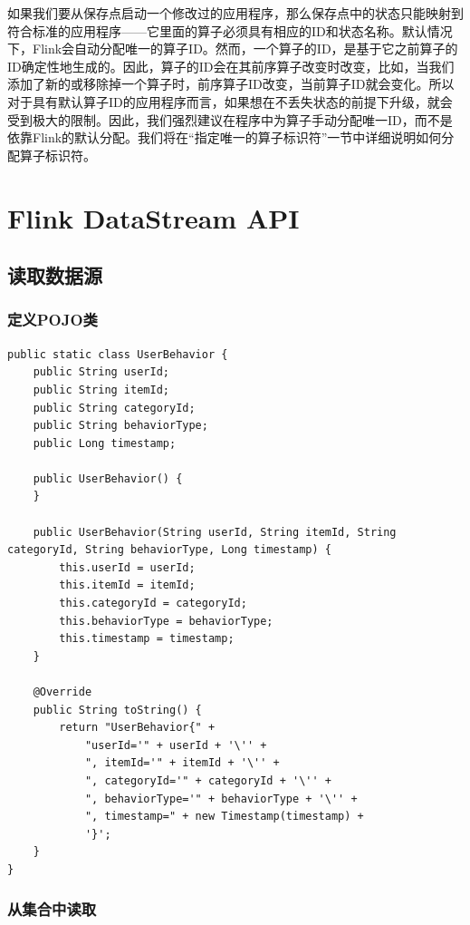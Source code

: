 \documentclass[cn,11pt,chinese]{elegantbook}
\begin{document}
如果我们要从保存点启动一个修改过的应用程序，那么保存点中的状态只能映射到符合标准的应用程序——它里面的算子必须具有相应的ID和状态名称。默认情况下，Flink会自动分配唯一的算子ID。然而，一个算子的ID，是基于它之前算子的ID确定性地生成的。因此，算子的ID会在其前序算子改变时改变，比如，当我们添加了新的或移除掉一个算子时，前序算子ID改变，当前算子ID就会变化。所以对于具有默认算子ID的应用程序而言，如果想在不丢失状态的前提下升级，就会受到极大的限制。因此，我们强烈建议在程序中为算子手动分配唯一ID，而不是依靠Flink的默认分配。我们将在“指定唯一的算子标识符”一节中详细说明如何分配算子标识符。

\chapter{Flink DataStream API}

\section{读取数据源}

\subsection{定义POJO类}

\begin{verbatim}
public static class UserBehavior {
    public String userId;
    public String itemId;
    public String categoryId;
    public String behaviorType;
    public Long timestamp;
    
    public UserBehavior() {
    }
    
    public UserBehavior(String userId, String itemId, String categoryId, String behaviorType, Long timestamp) {
        this.userId = userId;
        this.itemId = itemId;
        this.categoryId = categoryId;
        this.behaviorType = behaviorType;
        this.timestamp = timestamp;
    }
    
    @Override
    public String toString() {
        return "UserBehavior{" +
            "userId='" + userId + '\'' +
            ", itemId='" + itemId + '\'' +
            ", categoryId='" + categoryId + '\'' +
            ", behaviorType='" + behaviorType + '\'' +
            ", timestamp=" + new Timestamp(timestamp) +
            '}';
    }
}
\end{verbatim}

\subsection{从集合中读取}
\end{document}
